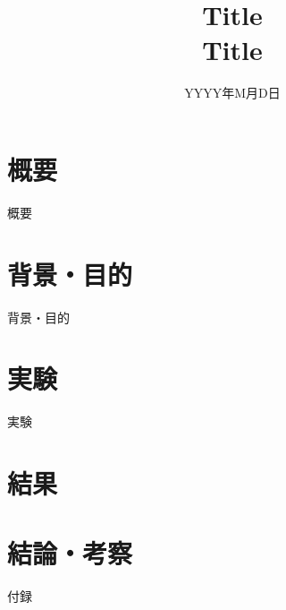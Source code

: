 \documentclass[12pt,a4paper,dvipdfmx,titlepage]{jsarticle}
\begin{document}
\title{
    Title\\
    \large Title
}

\author{
}

\date{YYYY年M月D日}

\maketitle

\section*{概要}
概要

\section*{背景・目的}
背景・目的

\section*{実験}
実験

\section*{結果}

\section*{結論・考察}

\pagebreak



\pagebreak

\begin{appendix}

付録

\end{appendix}
\end{document}
